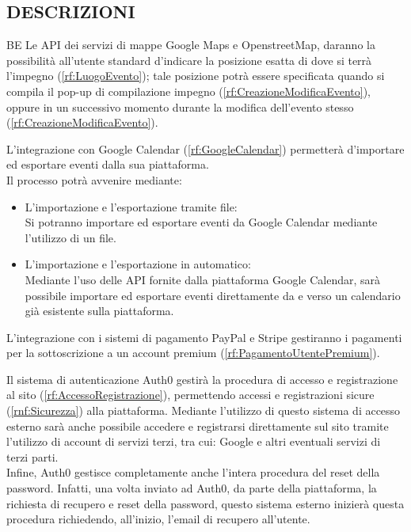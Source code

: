 \subsection*{DESCRIZIONI}
\begin{listaPersonale}{BE}
     Le API dei servizi di mappe Google Maps e OpenstreetMap, daranno la possibilità all'utente standard d'indicare la posizione esatta di dove si terrà l'impegno (\ref{rf:LuogoEvento}); tale posizione potrà essere specificata quando si compila il pop-up di compilazione impegno (\ref{rf:CreazioneModificaEvento}), oppure in un successivo momento durante la modifica dell'evento stesso (\ref{rf:CreazioneModificaEvento}).

     L'integrazione con Google Calendar (\ref{rf:GoogleCalendar}) permetterà d'importare ed esportare eventi dalla sua piattaforma.\\
    Il processo potrà avvenire mediante:
    \begin{itemize}
        \item L'importazione e l'esportazione tramite file: \\
              Si potranno importare ed esportare eventi da Google Calendar mediante l'utilizzo di un file.
        \item L'importazione e l'esportazione in automatico: \\
              Mediante l'uso delle API fornite dalla piattaforma Google Calendar, sarà possibile importare ed esportare eventi direttamente da e verso un calendario già esistente sulla piattaforma.
    \end{itemize}

     L'integrazione con i sistemi di pagamento PayPal e Stripe gestiranno i pagamenti per la sottoscrizione a un account premium (\ref{rf:PagamentoUtentePremium}).

     Il sistema di autenticazione Auth0 gestirà la procedura di accesso e registrazione al sito (\ref{rf:AccessoRegistrazione}), permettendo accessi e registrazioni sicure (\ref{rnf:Sicurezza}) alla piattaforma. Mediante l'utilizzo di questo sistema di accesso esterno sarà anche possibile accedere e registrarsi direttamente sul sito tramite l'utilizzo di account di servizi terzi, tra cui: Google e altri eventuali servizi di terzi parti. \\ Infine, Auth0 gestisce completamente anche l'intera procedura del reset della password. Infatti, una volta inviato ad Auth0, da parte della piattaforma, la richiesta di recupero e reset della password, questo sistema esterno inizierà questa procedura richiedendo, all'inizio, l'email di recupero all'utente.


\end{listaPersonale}
